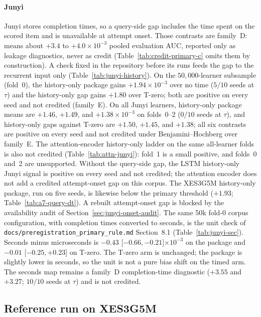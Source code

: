 \documentclass[review,12pt]{elsarticle}
\begin{document}
\paragraph{Junyi}
Junyi stores completion times, so a query-side gap includes the time
spent on the scored item and is unavailable at attempt onset. Those
contrasts are family~D: means about $+3.4$ to $+4.0\times 10^{-3}$
pooled evaluation AUC, reported only as leakage diagnostics, never as
credit (Table~\ref{tab:credit-primary-c} omits them by construction). A
check fixed in the repository before its runs feeds the gap to the
recurrent input only (Table~\ref{tab:junyi-history}). On the
$50{,}000$-learner subsample (fold~0), the history-only package gains
$+1.94\times 10^{-3}$ over no time ($5/10$ seeds at $\tau$) and the
history-only gap gains $+1.80$ over T-zero; both are positive on every
seed and not credited (family~E). On all Junyi learners, history-only
package means are $+1.46$, $+1.49$, and $+1.38\times 10^{-3}$ on
folds~0--2 ($0/10$ seeds at $\tau$), and history-only gaps against
T-zero are $+1.50$, $+1.45$, and $+1.38$; all six contrasts are
positive on every seed and not credited under Benjamini--Hochberg over
family~E. The attention-encoder history-only ladder on the same
all-learner folds is also not credited (Table~\ref{tab:attn-junyi}):
fold~1 is a small positive, and folds~0 and~2 are unsupported. Without
the query-side gap, the LSTM history-only Junyi signal is positive on
every seed and not credited; the attention encoder does not add a
credited attempt-onset gap on this corpus. The XES3G5M
history-only package, run on five seeds, is likewise below the primary
threshold ($+1.93$; Table~\ref{tab:a7-query-dt}). A rebuilt
attempt-onset gap is blocked by the availability audit of
Section~\ref{sec:junyi-onset-audit}.
The same 50k fold-0 corpus configuration, with completion times converted
to seconds, is the unit check of
\texttt{docs/preregistration\_primary\_rule.md} Section~8.1
(Table~\ref{tab:junyi-sec}). Seconds minus microseconds is
$-0.43$ [$-0.66,-0.21$]$\times 10^{-3}$ on the package and
$-0.01$ [$-0.25,+0.23$] on T-zero. The T-zero arm is unchanged; the
package is slightly lower in seconds, so the unit is not a pure bias
shift on the timed arm. The seconds map remains a family~D
completion-time diagnostic ($+3.55$ and $+3.27$; $10/10$ seeds at
$\tau$) and is not credited.




\subsection{Reference run on XES3G5M}
\label{sec:rq1-result}
\label{sec:time-result}
\end{document}
